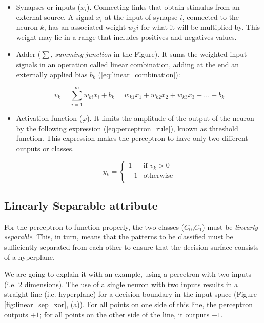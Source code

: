 \begin{itemize}
	\item Synapses or inputs ($x_i$). Connecting links that obtain stimulus from an external source. A signal $x_i$ at the input of synapse $i$, connected to the neuron $k$, has an associated weight $w_ki$ for what it will be multiplied by. This weight may lie in a range that includes positives and negatives values.

	\item Adder ($\sum$, \textit{summing junction} in the Figure). It sums the weighted input signals in an operation called linear combination, adding at the end an externally applied bias $b_k$ (\ref{eq:linear_combination}):

	\begin{equation}
	    \label{eq:linear_combination}
	        v_k=\sum_{i=1}^{m} w_{ki} x_i + b_k = w_{k1} x_1 + w_{k2} x_2 + w_{k3} x_3 + ... + b_k%
	\end{equation}

	\item Activation function ($\varphi$). It limits the amplitude of the output of the neuron by the following expression (\ref{eq:perceptron_rule}), known as threshold function. This expression makes the perceptron to have only two different outputs or classes. 

	\begin{equation}
	    \label{eq:perceptron_rule}
			y_k =
				\begin{cases}
			     	1 & \text{if } v_k > 0 \\
			        -1 & \text{otherwise} \\
				\end{cases}
		\end{equation}
	\end{itemize}

	\clearpage

	\subsection{Linearly Separable attribute}
	For the perceptron to function properly, the two classes ($C_0$,$C_1$) must be \textit{linearly separable}. This, in turn, means that the patterns to be classified must be sufficiently separated from each other to ensure that the decision surface consists of a hyperplane.

	\vspace{0.4cm}

	We are going to explain it with an example, using a percetron with two inputs (i.e. 2 dimensions). The use of a single neuron with two inputs results in a straight line (i.e. hyperplane) for a decision boundary in the input space (Figure \ref{fig:linear_sep_xor}, (a)). For all points on one side of this line, the perceptron outputs $+1$; for all points on the other side of the line, it outputs $-1$.

